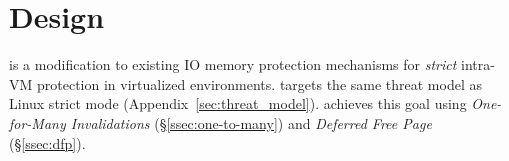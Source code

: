 \section{{\name} Design}
\label{sec:design}
{\name} is a modification to existing IO memory protection mechanisms
    for {\it strict} intra-VM protection in virtualized environments. {\name} targets the same threat model as Linux strict mode (Appendix~\ref{sec:threat_model}).
{\name} achieves this goal using {\em One-for-Many Invalidations} (\S\ref{ssec:one-to-many}) 
    and {\em Deferred Free Page} (\S\ref{ssec:dfp}). %







